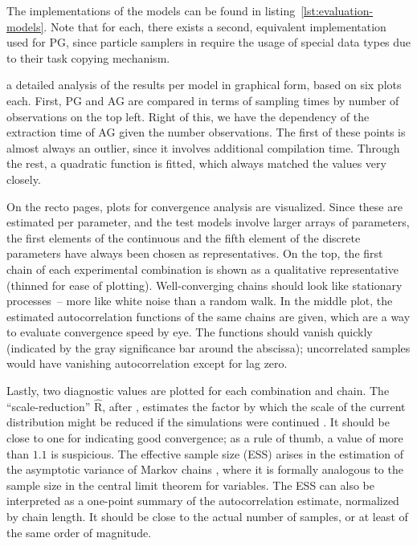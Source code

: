 The \dppljl{} implementations of the models can be found in listing~\ref{lst:evaluation-models}.
Note that for each, there exists a second, equivalent implementation used for PG, since particle
samplers in \turingjl{} require the usage of special data types due to their task copying mechanism.

 a detailed analysis of the results per model in graphical form, based on six
plots each.  First, PG and AG are compared in terms of sampling times by number of observations on
the top left.  Right of this, we have the dependency of the extraction time of AG given the number
observations.  The first of these points is almost always an outlier, since it involves additional
compilation time.  Through the rest, a quadratic function is fitted, which always matched the values
very closely.

On the recto pages, plots for convergence analysis are visualized.  Since these are estimated per
parameter, and the test models involve larger arrays of parameters, the first elements of the
continuous and the fifth element of the discrete parameters have always been chosen as
representatives.  On the top, the first chain of each experimental combination is shown as a
qualitative representative (thinned for ease of plotting).  Well-converging chains should look like
stationary processes~-- more like white noise than a random walk.  In the middle plot, the estimated
autocorrelation functions of the same chains are given, which are a way to evaluate convergence
speed by eye.  The functions should vanish quickly (indicated by the gray significance bar around
the abscissa); uncorrelated samples would have vanishing autocorrelation except for lag zero.

Lastly, two diagnostic values are plotted for each combination and chain.  The
\enquote{scale-reduction} \(\widehat{\mathrm{R}}\), after \textcite{gelman1992inference}, estimates
the factor by which the scale of the current distribution might be reduced if the simulations were
continued \parencite[see][p. 285]{gelman2020bayesian}.  It should be close to one for indicating
good convergence; as a rule of thumb, a value of more than \(1.1\) is suspicious.  The effective
sample size (ESS) arises in the estimation of the asymptotic variance of Markov chains
\parencite[][section 7.2]{vihola2020lectures}, where it is formally analogous to the sample size in
the central limit theorem for \iid{} variables.  The ESS can also be interpreted as a one-point
summary of the autocorrelation estimate, normalized by chain length.  It should be close to the
actual number of samples, or at least of the same order of magnitude.

